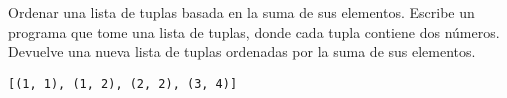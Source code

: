 \begin{exercise}
Ordenar una lista de tuplas basada en la suma de sus elementos.
Escribe un programa que tome una lista de tuplas, donde cada tupla
contiene dos números. Devuelve una nueva lista de tuplas ordenadas por
la suma de sus elementos.

\begin{Shaded}
\begin{Highlighting}[]
     \NormalTok{(}
        \NormalTok{(}
            \NormalTok{(}
\OperatorTok{=} \NormalTok{ x: x[}\NormalTok{] }\OperatorTok{+}\NormalTok{ x[}\NormalTok{]}
\NormalTok{            )}
\NormalTok{        )}
\NormalTok{    )}

\OperatorTok{=}\NormalTok{ [(}\NormalTok{, }\NormalTok{), (}\NormalTok{, }\NormalTok{), (}\NormalTok{, }\NormalTok{), (}\NormalTok{, }\NormalTok{)]}
\OperatorTok{=}
\end{Highlighting}
\end{Shaded}

\begin{verbatim}
[(1, 1), (1, 2), (2, 2), (3, 4)]

\end{verbatim}
\end{exercise}

